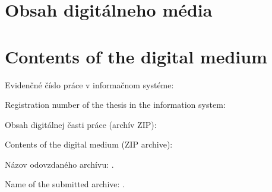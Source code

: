 \thispagestyle{empty}

\ifx\FIITlagEN\undefined
    \chapter{Obsah digitálneho média}
\else
    \chapter{Contents of the digital medium}
\fi

\renewcommand*{\thepage}{C-\arabic{page}}

\ifx\FIITlagEN\undefined
    \par Evidenčné číslo práce v informačnom systéme: \FIITevidenceNumber
\else
    \par Registration number of the thesis in the information system: \FIITevidenceNumber
\fi

\ifx\FIITlagEN\undefined
    \par Obsah digitálnej časti práce (archív ZIP):
\else
    \par Contents of the digital medium (ZIP archive):
\fi





\ifx\FIITlagEN\undefined
    \par Názov odovzdaného archívu: \FIITArchiveName.
\else
    \par Name of the submitted archive: \FIITArchiveName.
\fi
